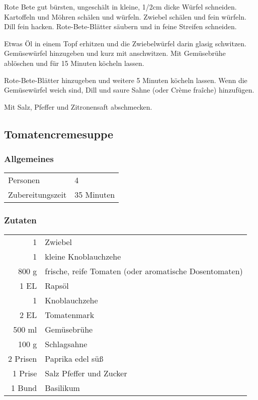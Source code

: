 Rote Bete gut bürsten, ungeschält in kleine, 1/2cm dicke Würfel schneiden. Kartoffeln und Möhren schälen und würfeln. Zwiebel schälen und fein würfeln. Dill fein hacken. Rote-Bete-Blätter säubern und in feine Streifen schneiden.

Etwas Öl in einem Topf erhitzen und die Zwiebelwürfel darin glasig schwitzen. Gemüsewürfel hinzugeben und kurz mit anschwitzen. Mit Gemüsebrühe ablöschen und für 15 Minuten köcheln lassen.

Rote-Bete-Blätter hinzugeben und weitere 5 Minuten köcheln lassen. Wenn die Gemüsewürfel weich sind, Dill und saure Sahne (oder Crème fraîche) hinzufügen.

Mit Salz, Pfeffer und Zitronensaft abschmecken.

\subsection{Tomatencremesuppe}\label{sec:Tomatensuppe cremig}
\subsubsection*{Allgemeines}
\begin{tabular}{ll}
    Personen         &  4   \\
    Zubereitungszeit &  35 Minuten \\
\end{tabular} 
\subsubsection*{Zutaten}
\begin{tabular}{r l}
           1 & Zwiebel                                                \\
           1 & kleine Knoblauchzehe                                   \\
       800 g & frische, reife Tomaten (oder aromatische Dosentomaten) \\
        1 EL & Rapsöl                                                   \\
           1 & Knoblauchzehe                                          \\
        2 EL & Tomatenmark                                                       \\
      500 ml & Gemüsebrühe                                            \\
       100 g & Schlagsahne                                            \\
    2 Prisen & Paprika edel süß                                        \\
     1 Prise & Salz Pfeffer und Zucker                              \\
      1 Bund & Basilikum
\end{tabular}

